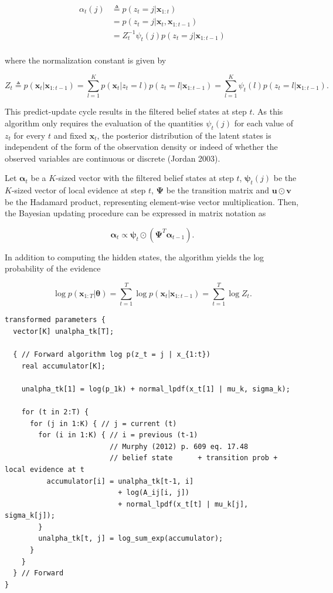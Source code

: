 \documentclass[]{article}
\newcommand{\mat}[1]{\mathbf{#1}}
\begin{document}
\begin{align*}
\label{eq:filtered-beliefstate}
\alpha_t(j) 
  & \triangleq  p(z_t = j | \mat{x}_{1:t}) \\
  &= p(z_t = j | \mat{x}_{t}, \mat{x}_{1:t-1}) \\
  &= Z_t^{-1} \psi_t(j) p(z_t = j | \mat{x}_{1:t-1}) \\
\end{align*}

where the normalization constant is given by

\[
Z_t
  \triangleq  p(\mat{x}_t | \mat{x}_{1:t-1})
  = \sum_{l=1}^{K}{p(\mat{x}_{t} | z_t = l) p(z_t = l | \mat{x}_{1:t-1})}
  = \sum_{l=1}^{K}{\psi_t(l) p(z_t = l | \mat{x}_{1:t-1})}.
\]

This predict-update cycle results in the filtered belief states at step
\(t\). As this algorithm only requires the evaluation of the quantities
\(\psi_t(j)\) for each value of \(z_t\) for every \(t\) and fixed
\(\mat{x}_t\), the posterior distribution of the latent states is
independent of the form of the observation density or indeed of whether
the observed variables are continuous or discrete (Jordan 2003).

Let \(\mat{\alpha}_t\) be a \(K\)-sized vector with the filtered belief
states at step \(t\), \(\mat{\psi}_t(j)\) be the \(K\)-sized vector of
local evidence at step \(t\), \(\mat{\Psi}\) be the transition matrix
and \(\mat{u} \odot \mat{v}\) be the Hadamard product, representing
element-wise vector multiplication. Then, the Bayesian updating
procedure can be expressed in matrix notation as

\[
\mat{\alpha}_t \propto \mat{\psi}_t \odot (\mat{\Psi}^T \mat{\alpha}_{t-1}).
\]

In addition to computing the hidden states, the algorithm yields the log
probability of the evidence

\[
\log p(\mat{x}_{1:T} | \mat{\theta}) = \sum_{t=1}^{T}{\log p(\mat{x}_{t} | \mat{x}_{1:t-1})} = \sum_{t=1}^{T}{\log Z_t}.
\]

\begin{verbatim}
transformed parameters {
  vector[K] unalpha_tk[T];

  { // Forward algorithm log p(z_t = j | x_{1:t})
    real accumulator[K];

    unalpha_tk[1] = log(p_1k) + normal_lpdf(x_t[1] | mu_k, sigma_k);

    for (t in 2:T) {
      for (j in 1:K) { // j = current (t)
        for (i in 1:K) { // i = previous (t-1)
                         // Murphy (2012) p. 609 eq. 17.48
                         // belief state      + transition prob + local evidence at t
          accumulator[i] = unalpha_tk[t-1, i] 
                           + log(A_ij[i, j]) 
                           + normal_lpdf(x_t[t] | mu_k[j], sigma_k[j]);
        }
        unalpha_tk[t, j] = log_sum_exp(accumulator);
      }
    }
  } // Forward
}
\end{verbatim}
\end{document}
